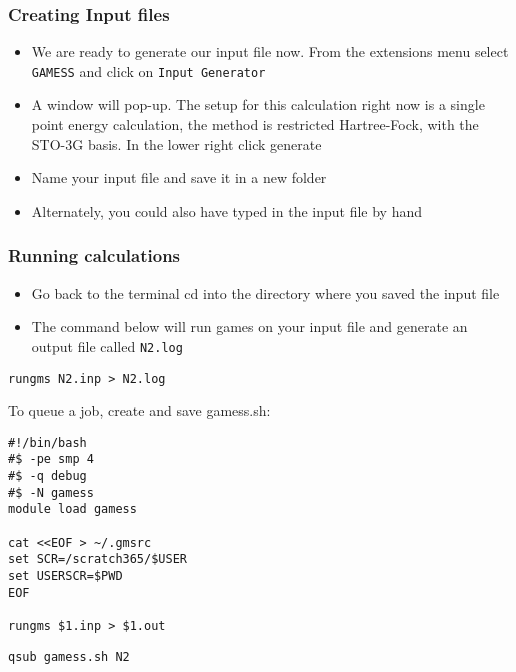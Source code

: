\documentclass[11pt]{article}
\begin{document}
\subsubsection{Creating Input files}
\label{sec:org5bfe3b5}

\begin{itemize}
\item We are ready to generate our input file now. From the extensions menu select \texttt{GAMESS} and click on \texttt{Input Generator}

\item A window will pop-up. The setup for this calculation right now is a single point energy calculation, the method is restricted Hartree-Fock, with the STO-3G basis. In the lower right click generate

\item Name your input file and save it in a new folder

\item Alternately, you could also have typed in the input file by hand
\end{itemize}

\subsubsection{Running calculations}
\label{sec:org63d15ac}

\begin{itemize}
\item Go back to the terminal cd into the directory where you saved the input file

\item The command below will run games on your input file and generate an output file called \texttt{N2.log}
\end{itemize}

\begin{verbatim}
rungms N2.inp > N2.log
\end{verbatim}

To queue a job, create and save gamess.sh:
\begin{verbatim}
#!/bin/bash
#$ -pe smp 4
#$ -q debug
#$ -N gamess
module load gamess

cat <<EOF > ~/.gmsrc
set SCR=/scratch365/$USER
set USERSCR=$PWD
EOF

rungms $1.inp > $1.out
\end{verbatim}

\begin{verbatim}
qsub gamess.sh N2
\end{verbatim}
\end{document}
